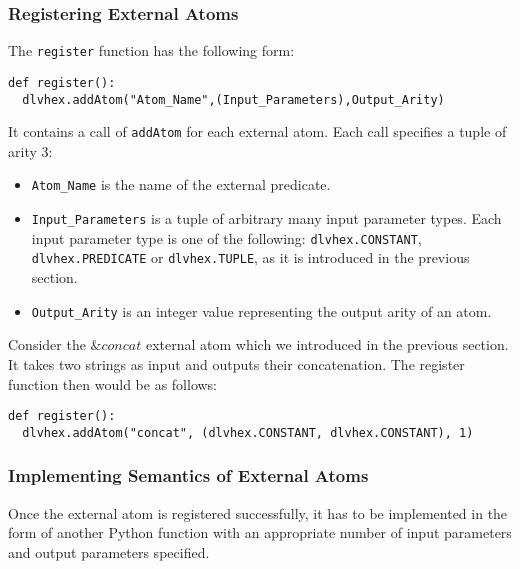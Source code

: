 \documentclass[a4paper, titlepage]{article}
\begin{document}
\subsubsection{Registering External Atoms}
\label{registerExtAtom}
The \verb+register+ function has the following form:
\begin{verbatim} 
def register():
  dlvhex.addAtom("Atom_Name",(Input_Parameters),Output_Arity) 
\end{verbatim}
It contains a call of \verb+addAtom+ for each external atom. Each call specifies a tuple of arity 3:
\begin{itemize}
\item \verb+Atom_Name+ is the name of the 
external predicate.
\item \verb+Input_Parameters+ is a tuple of arbitrary many input parameter types. Each input parameter type is one of the 
following: \verb+dlvhex.CONSTANT+, \verb+dlvhex.PREDICATE+ or 
\verb+dlvhex.TUPLE+, as it is introduced in the previous section.
\item \verb+Output_Arity+ is an integer value representing the output arity of an atom.  
\end{itemize}
Consider the $\mathit{\&concat}$ external atom which we introduced in the previous section. It takes two strings as input and outputs their concatenation. The register function then would be as follows:
\begin{verbatim}
def register():
  dlvhex.addAtom("concat", (dlvhex.CONSTANT, dlvhex.CONSTANT), 1)  
\end{verbatim}

\subsubsection{Implementing Semantics of External Atoms}
Once the external atom is registered successfully, it has 
to be implemented in the form of another Python function 
with an appropriate number of input parameters and output parameters specified.
\end{document}
